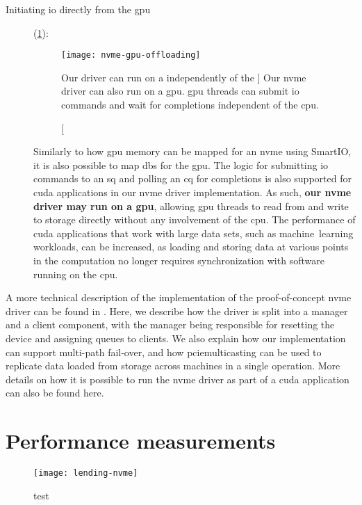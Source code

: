 \begin{description}
    \item[Initiating \gls{io} directly from the \gls{gpu}] (\cref{fig:nvme-gpu-offloading}):
\begin{figure}
    \centering
    \texttt{[image: nvme-gpu-offloading]}
    \caption
    [Our  driver can run on a  independently of the ]
    {Our \gls{nvme} driver can also run on a \gls{gpu}. \Gls{gpu} threads can submit \gls{io} commands and wait for completions independent of the \gls{cpu}.}
    \label{fig:nvme-gpu-offloading}
\end{figure}
        Similarly to how \gls{gpu} memory can be mapped for an \gls{nvme} using SmartIO, it is also possible to map \glspl{db} for the \gls{gpu}.
        The logic for submitting \gls{io} commands to an \gls{sq} and polling an \gls{cq} for completions is also supported for \gls{cuda} applications in our \gls{nvme} driver implementation.
        As such, \textbf{our \gls{nvme} driver may run on a \gls{gpu}}, allowing \gls{gpu} threads to read from and write to storage directly without any involvement of the \gls{cpu}.
        The performance of \gls{cuda} applications that work with large data sets, such as machine~learning workloads, can be increased, as loading and storing data at various points in the computation no longer requires synchronization with software running on the \gls{cpu}.
        

\end{description}


A more technical description of the implementation of the proof-of-concept \gls{nvme} driver can be found in .
%
Here, we describe how the driver is split into a manager and a client component, with the manager being responsible for resetting the device and assigning queues to clients.
%
We also explain how our implementation can support multi-path fail-over, and how \gls{pciemulticasting} can be used to replicate data loaded from storage across machines in a single operation.
%
More details on how it is possible to run the \gls{nvme} driver as part of a \gls{cuda} application can also be found here.



\section{Performance measurements}\label{sec:eval}
\begin{figure}
    \centering
    \texttt{[image: lending-nvme]}
    \caption{test}
\end{figure}

